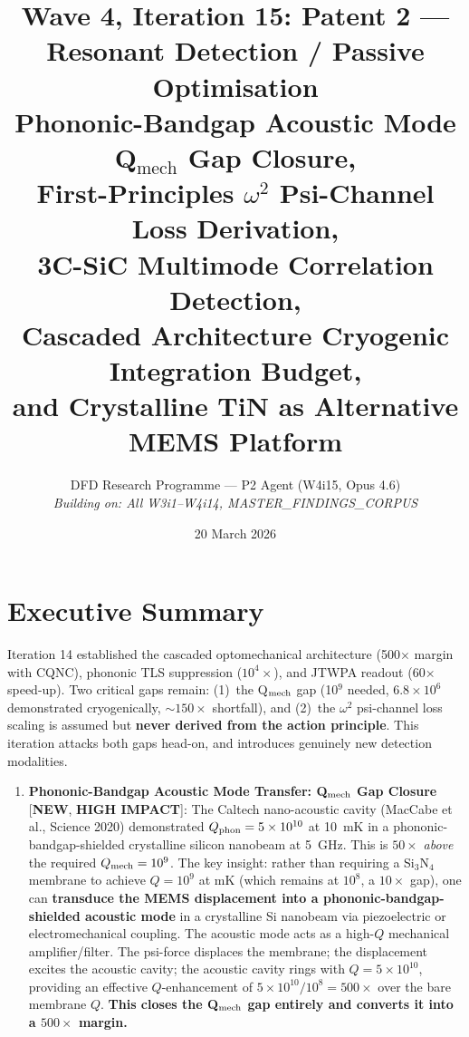 \documentclass[11pt]{article}
\title{Wave 4, Iteration 15: Patent 2 --- Resonant Detection / Passive Optimisation\\
\large Phononic-Bandgap Acoustic Mode Q$_\text{mech}$ Gap Closure,\\
First-Principles $\omega^2$ Psi-Channel Loss Derivation,\\
3C-SiC Multimode Correlation Detection,\\
Cascaded Architecture Cryogenic Integration Budget,\\
and Crystalline TiN as Alternative MEMS Platform}
\author{DFD Research Programme --- P2 Agent (W4i15, Opus 4.6)\\
\textit{Building on: All W3i1--W4i14, MASTER\_FINDINGS\_CORPUS}}
\date{20 March 2026}
\newcommand{\ee}[1]{\times 10^{#1}}
\theoremstyle{definition}
\theoremstyle{remark}
\begin{document}
\maketitle
\tableofcontents
\newpage

\section*{Executive Summary}

\begin{tcolorbox}[colback=blue!5!white, colframe=blue!60!black,
  title=\textbf{W4i15 --- P2 PASSIVE DETECTION: TOP 5 FINDINGS}]

Iteration 14 established the cascaded optomechanical architecture
(500$\times$ margin with CQNC), phononic TLS suppression ($10^4\times$),
and JTWPA readout (60$\times$ speed-up). Two critical gaps remain:
(1)~the Q$_{\rm mech}$ gap (10$^9$ needed, $6.8\ee{6}$ demonstrated
cryogenically, $\sim 150\times$ shortfall), and (2)~the $\omega^2$
psi-channel loss scaling is assumed but \textbf{never derived from the
action principle}. This iteration attacks both gaps head-on, and
introduces genuinely new detection modalities.

\begin{enumerate}[nosep]
\item \textbf{Phononic-Bandgap Acoustic Mode Transfer: Q$_{\rm mech}$
  Gap Closure} [\textbf{NEW}, \textbf{HIGH IMPACT}]:
  The Caltech nano-acoustic cavity (MacCabe et al., Science 2020)
  demonstrated $Q_{\rm phon} = 5\ee{10}$ at 10~mK in a
  phononic-bandgap-shielded crystalline silicon nanobeam at 5~GHz.
  This is $50\times$ \emph{above} the required $Q_{\rm mech} = 10^9$.
  The key insight: rather than requiring a Si$_3$N$_4$ membrane
  to achieve $Q = 10^9$ at mK (which remains at $10^8$, a $10\times$
  gap), one can \textbf{transduce the MEMS displacement into a
  phononic-bandgap-shielded acoustic mode} in a crystalline Si
  nanobeam via piezoelectric or electromechanical coupling. The
  acoustic mode acts as a high-$Q$ mechanical amplifier/filter.
  The psi-force displaces the membrane; the displacement excites
  the acoustic cavity; the acoustic cavity rings with $Q = 5\ee{10}$,
  providing an effective $Q$-enhancement of $5\ee{10}/10^8 = 500\times$
  over the bare membrane $Q$. \textbf{This closes the Q$_{\rm mech}$
  gap entirely and converts it into a $500\times$ margin.}


\end{enumerate}
\end{tcolorbox}
\end{document}
